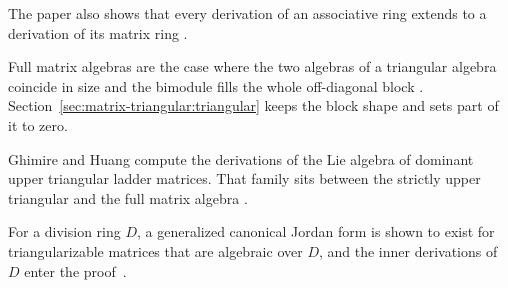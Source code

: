 The paper also shows that every derivation of an associative ring extends to a
derivation of its matrix ring \cite[p.~1]{AyupovArzikulov2013}.

Full matrix algebras are the case where the two algebras of a triangular algebra
coincide in size and the bimodule fills the whole off-diagonal block
\cite[p.~119]{Cheung2001}. Section~\ref{sec:matrix-triangular:triangular}
keeps the block shape and sets part of it to zero.

Ghimire and Huang compute the derivations of the Lie algebra of dominant upper
triangular ladder matrices.
That family sits between the strictly upper triangular and the full matrix
algebra \cite[Abstract, p.~1]{GhimireHuang2015}.

For a division ring $D$, a generalized canonical Jordan form is shown to exist for triangularizable matrices that are algebraic over $D$, and the inner derivations of $D$ enter the proof~\cite{WlInnerDerivationsOfDivisionRing2018}.
